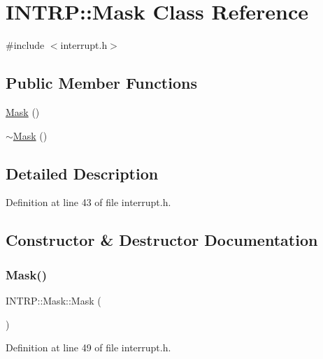 \hypertarget{class_i_n_t_r_p_1_1_mask}{}\section{I\+N\+T\+RP\+:\+:Mask Class Reference}
\label{class_i_n_t_r_p_1_1_mask}


{\ttfamily \#include $<$interrupt.\+h$>$}

\subsection*{Public Member Functions}
\begin{DoxyCompactItemize}
\item 
\hyperlink{class_i_n_t_r_p_1_1_mask_addd528b308ed524deeac0c632e07d467}{Mask} ()
\item 
\hyperlink{class_i_n_t_r_p_1_1_mask_a9510ca576c94618168e76d14521c3e6d}{$\sim$\+Mask} ()
\end{DoxyCompactItemize}


\subsection{Detailed Description}


Definition at line 43 of file interrupt.\+h.



\subsection{Constructor \& Destructor Documentation}
\mbox{\label{class_i_n_t_r_p_1_1_mask_addd528b308ed524deeac0c632e07d467}} 
\subsubsection{\texorpdfstring{Mask()}{Mask()}}
{\footnotesize\ttfamily I\+N\+T\+R\+P\+::\+Mask\+::\+Mask (\begin{DoxyParamCaption}{ }\end{DoxyParamCaption})\hspace{0.3cm}{\ttfamily [inline]}}



Definition at line 49 of file interrupt.\+h.

